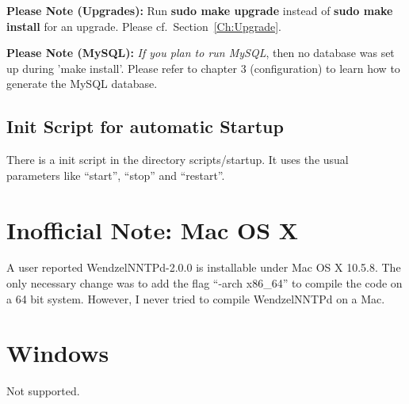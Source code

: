 {\bf Please Note (Upgrades):} Run {\bf sudo make upgrade} instead of {\bf sudo make install} for an upgrade. Please cf.\ Section~\ref{Ch:Upgrade}.

{\bf Please Note (MySQL):} {\it If you plan to run MySQL}, then no database was set up during 'make install'. Please refer to chapter 3 (configuration) to learn how to generate the MySQL database.

\subsection{Init Script for automatic Startup}

There is a init script in the directory scripts/startup. It uses the usual parameters like ``start'', ``stop'' and ``restart''.

\section{Inofficial Note: Mac OS X}

A user reported WendzelNNTPd-2.0.0 is installable under Mac OS X 10.5.8. The only necessary change was to add the flag ``-arch x86\_64'' to compile the code on a 64 bit system. However, I never tried to compile WendzelNNTPd on a Mac.

\section{Windows}

Not supported.


